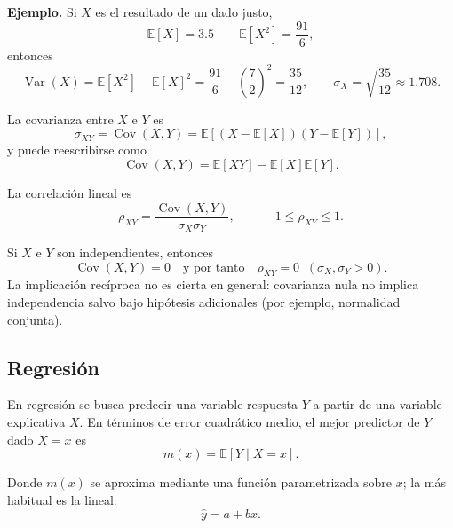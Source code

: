 \documentclass[12pt]{report} %
\begin{document}
\textbf{Ejemplo.} Si $X$ es el resultado de un dado justo,
$$
    \mathbb{E}[X]=3.5
    \qquad
    \mathbb{E}[X^2]=\frac{91}{6},
$$
entonces
$$
    \operatorname{Var}(X)=\mathbb{E}[X^2]-\mathbb{E}[X]^2
    =\frac{91}{6}-\left(\frac{7}{2}\right)^2
    =\frac{35}{12},
    \qquad
    \sigma_X=\sqrt{\frac{35}{12}}\approx 1.708.
$$

La covarianza entre $X$ e $Y$ es
\begin{equation}
    \sigma_{XY}=\operatorname{Cov}(X,Y)=\mathbb{E}\left[(X-\mathbb{E}[X])(Y-\mathbb{E}[Y])\right],
    \label{eq:covariance_definition_stat}
\end{equation}
y puede reescribirse como
\begin{equation}
    \operatorname{Cov}(X,Y)=\mathbb{E}[XY]-\mathbb{E}[X]\mathbb{E}[Y].
    \label{eq:covariance_alt_form_stat}
\end{equation}

La correlación lineal es
\begin{equation}
    \rho_{XY}=\frac{\operatorname{Cov}(X,Y)}{\sigma_X\sigma_Y},
    \qquad -1\leq\rho_{XY}\leq 1.
    \label{eq:correlation_definition_stat}
\end{equation}

Si $X$ e $Y$ son independientes, entonces
\begin{equation}
    \operatorname{Cov}(X,Y)=0
    \quad\text{y por tanto}\quad
    \rho_{XY}=0
    \;\; (\sigma_X,\sigma_Y>0).
    \label{eq:independence_implies_zero_cov_stat}
\end{equation}
La implicación recíproca no es cierta en general: covarianza nula no implica independencia salvo bajo hipótesis adicionales (por ejemplo, normalidad conjunta).

\subsection{Regresión}

En regresión se busca predecir una variable respuesta $Y$ a partir de una variable explicativa $X$. En términos de error cuadrático medio, el mejor predictor de $Y$ dado $X=x$ es
\begin{equation}
    m(x)=\mathbb{E}[Y\mid X=x].
    \label{eq:best_predictor_conditional_mean_stat}
\end{equation}

Donde $m(x)$ se aproxima mediante una función parametrizada sobre $x$; la más habitual es la lineal:
\begin{equation}
    \hat{y}=a+bx.
    \label{eq:simple_linear_regression_form_stat}
\end{equation}
\end{document}
